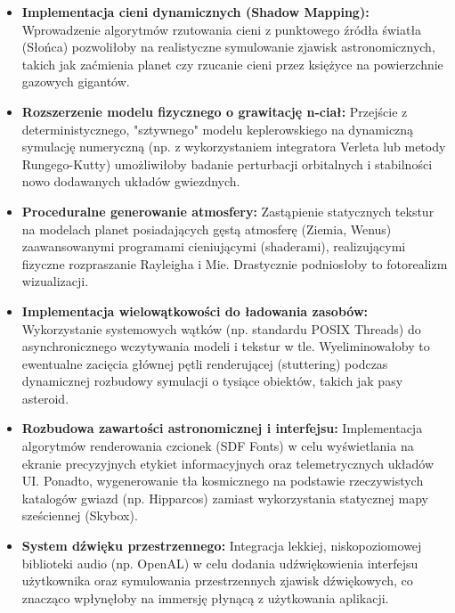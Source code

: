 \documentclass[xodstep]{wnspt}
\begin{document}
\begin{itemize}
    \item \textbf{Implementacja cieni dynamicznych (Shadow Mapping):} Wprowadzenie algorytmów rzutowania cieni z punktowego źródła światła (Słońca) pozwoliłoby na realistyczne symulowanie zjawisk astronomicznych, takich jak zaćmienia planet czy rzucanie cieni przez księżyce na powierzchnie gazowych gigantów.
    
    \item \textbf{Rozszerzenie modelu fizycznego o grawitację n-ciał:} Przejście z deterministycznego, "sztywnego" modelu keplerowskiego na dynamiczną symulację numeryczną (np. z wykorzystaniem integratora Verleta lub metody Rungego-Kutty) umożliwiłoby badanie perturbacji orbitalnych i stabilności nowo dodawanych układów gwiezdnych.
    
    \item \textbf{Proceduralne generowanie atmosfery:} Zastąpienie statycznych tekstur na modelach planet posiadających gęstą atmosferę (Ziemia, Wenus) zaawansowanymi programami cieniującymi (shaderami), realizującymi fizyczne rozpraszanie Rayleigha i Mie. Drastycznie podniosłoby to fotorealizm wizualizacji.
    
    \item \textbf{Implementacja wielowątkowości do ładowania zasobów:} Wykorzystanie systemowych wątków (np. standardu POSIX Threads) do asynchronicznego wczytywania modeli i tekstur w tle. Wyeliminowałoby to ewentualne zacięcia głównej pętli renderującej (stuttering) podczas dynamicznej rozbudowy symulacji o tysiące obiektów, takich jak pasy asteroid.
    
    \item \textbf{Rozbudowa zawartości astronomicznej i interfejsu:} Implementacja algorytmów renderowania czcionek (SDF Fonts) w celu wyświetlania na ekranie precyzyjnych etykiet informacyjnych oraz telemetrycznych układów UI. Ponadto, wygenerowanie tła kosmicznego na podstawie rzeczywistych katalogów gwiazd (np. Hipparcos) zamiast wykorzystania statycznej mapy sześciennej (Skybox).
    
    \item \textbf{System dźwięku przestrzennego:} Integracja lekkiej, niskopoziomowej biblioteki audio (np. OpenAL) w celu dodania udźwiękowienia interfejsu użytkownika oraz symulowania przestrzennych zjawisk dźwiękowych, co znacząco wpłynęłoby na immersję płynącą z użytkowania aplikacji.
\end{itemize}
\end{document}
